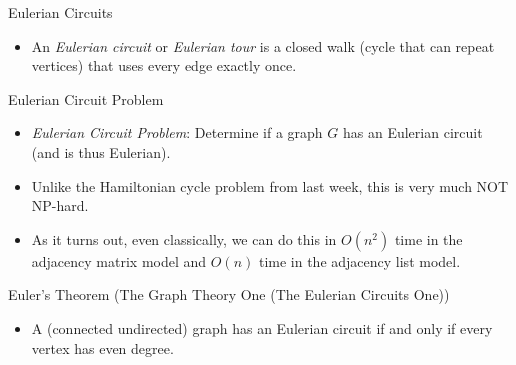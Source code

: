 \documentclass[aspectratio=169, handout]{beamer}
\begin{document}
\begin{frame}{Eulerian Circuits}
    \begin{itemize}
        \item An \emph{Eulerian circuit} or \emph{Eulerian tour} is a closed walk (cycle that can repeat vertices) that uses every edge exactly once. \pause
        \begin{center}
    \end{center}
    \end{itemize}
\end{frame}

\begin{frame}{Eulerian Circuit Problem}
    \begin{itemize}
        \item \emph{Eulerian Circuit Problem}: Determine if a graph $G$ has an Eulerian circuit (and is thus Eulerian). \pause
        \item Unlike the Hamiltonian cycle problem from last week, this is very much NOT NP-hard.
        \item As it turns out, even classically, we can do this in $O(n^2)$ time in the adjacency matrix model and $O(n)$ time in the adjacency list model.
    \end{itemize}
\end{frame}

\begin{frame}{Euler's Theorem (The Graph Theory One (The Eulerian Circuits One))}
    \begin{itemize}
        \item A (connected undirected) graph has an Eulerian circuit if and only if every vertex has even degree.
    \end{itemize}
\end{frame}
\end{document}
